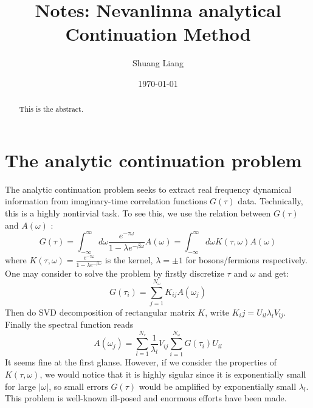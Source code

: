 \documentclass[
	preprint,%
	aps,
	prb,
	showpacs,	
	amsmath, amssymb]{revtex4-2}
\DeclareRobustCommand{\+}{\hstretch{1.25} {\boldsymbol {\mathrel{+}}}}
\begin{document}
\title{Notes: Nevanlinna analytical Continuation Method}
\author{Shuang Liang}



\date{\today}
\begin{abstract}
	This is the abstract.
\end{abstract}


\maketitle
\tableofcontents

\newpage
\section{The analytic continuation problem}
\label{sec:the-analytic-continuation-problem}

The analytic continuation problem seeks   
to extract real frequency dynamical information from
imaginary-time correlation functions $G(\tau)$ data.
Technically, this is a highly nontirvial task\cite{jarrell1996bayesian}. To 
see this, we use the relation between $G(\tau)$ and $A(\omega)$
\cite{jarrell1996bayesian,XiaoLRT}:
\begin{equation}\label{eq:gt-Aw}
	G(\tau) = \int_{-\infty}^{\infty} d\omega
		\frac{e^{-\tau \omega }}{1 - \lambda e^{-\beta \omega}}
		A(\omega)
		= \int_{-\infty}^{\infty} d\omega
		K(\tau, \omega) A(\omega)
\end{equation}
where $K(\tau, \omega) = \frac{e^{-\tau \omega }}{1 - \lambda e^{-\beta \omega}}$
is the kernel, $\lambda =\pm 1$ for bosons/fermions respectively. One may consider to solve the problem by firstly 
discretize $\tau$ and $\omega$ and get:
\begin{equation}
	G(\tau_i) = \sum_{j=1}^{N_\omega} K_{ij} A(\omega_j)
\end{equation}
Then do SVD decomposition of rectangular matrix $K$, write
$K_ij = U_{il} \lambda_l V_{lj}$. Finally the spectral function 
reads
\begin{equation}
	A(\omega_j) = \sum_{l=1}^{N_\tau} \frac{1}{\lambda_l} V_{ij}
		\sum_{i=1}^{N_\omega} G(\tau_i) U_{il}
\end{equation}
It seems fine at the first glanse. However, if we consider 
the properties of $K(\tau, \omega)$, we would notice that it 
is highly sigular since it is exponentially small for large 
$|\omega|$, so small errors $G(\tau)$ would be amplified by
exponentially small $\lambda_l$. This problem is well-known
ill-posed\cite{acton1997numerical, peschel1999density} and 
enormous efforts have been made\cite{}.
\end{document}

